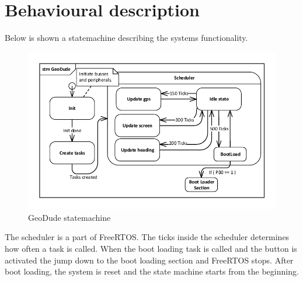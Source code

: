 \section{Behavioural description}
Below is shown a statemachine describing the systems functionality.
\begin{figure}
\centering
\includegraphics[width=.8\textwidth]{billeder/geodudeSTM}
\caption{GeoDude statemachine}
\end{figure}
The scheduler is a part of FreeRTOS. The ticks inside the scheduler determines how often a task is called. When the boot loading task is called and the button is activated the jump down to the boot loading section and FreeRTOS stops. After boot loading, the system is reset and the state machine starts from the beginning.

